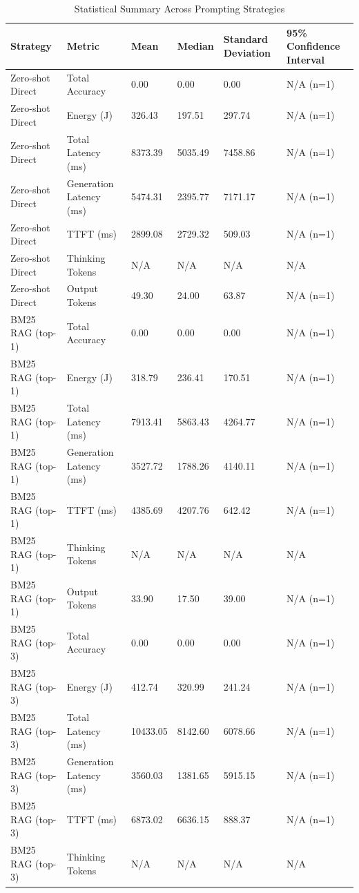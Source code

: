 \begin{table}
\caption{Statistical Summary Across Prompting Strategies}
\label{tab:statistical_summary}
\begin{tabular}{llllll}
\toprule
Strategy & Metric & Mean & Median & Standard Deviation & 95\% Confidence Interval \\
\midrule
Zero-shot Direct & Total Accuracy & 0.00 & 0.00 & 0.00 & N/A (n=1) \\
Zero-shot Direct & Energy (J) & 326.43 & 197.51 & 297.74 & N/A (n=1) \\
Zero-shot Direct & Total Latency (ms) & 8373.39 & 5035.49 & 7458.86 & N/A (n=1) \\
Zero-shot Direct & Generation Latency (ms) & 5474.31 & 2395.77 & 7171.17 & N/A (n=1) \\
Zero-shot Direct & TTFT (ms) & 2899.08 & 2729.32 & 509.03 & N/A (n=1) \\
Zero-shot Direct & Thinking Tokens & N/A & N/A & N/A & N/A \\
Zero-shot Direct & Output Tokens & 49.30 & 24.00 & 63.87 & N/A (n=1) \\
BM25 RAG (top-1) & Total Accuracy & 0.00 & 0.00 & 0.00 & N/A (n=1) \\
BM25 RAG (top-1) & Energy (J) & 318.79 & 236.41 & 170.51 & N/A (n=1) \\
BM25 RAG (top-1) & Total Latency (ms) & 7913.41 & 5863.43 & 4264.77 & N/A (n=1) \\
BM25 RAG (top-1) & Generation Latency (ms) & 3527.72 & 1788.26 & 4140.11 & N/A (n=1) \\
BM25 RAG (top-1) & TTFT (ms) & 4385.69 & 4207.76 & 642.42 & N/A (n=1) \\
BM25 RAG (top-1) & Thinking Tokens & N/A & N/A & N/A & N/A \\
BM25 RAG (top-1) & Output Tokens & 33.90 & 17.50 & 39.00 & N/A (n=1) \\
BM25 RAG (top-3) & Total Accuracy & 0.00 & 0.00 & 0.00 & N/A (n=1) \\
BM25 RAG (top-3) & Energy (J) & 412.74 & 320.99 & 241.24 & N/A (n=1) \\
BM25 RAG (top-3) & Total Latency (ms) & 10433.05 & 8142.60 & 6078.66 & N/A (n=1) \\
BM25 RAG (top-3) & Generation Latency (ms) & 3560.03 & 1381.65 & 5915.15 & N/A (n=1) \\
BM25 RAG (top-3) & TTFT (ms) & 6873.02 & 6636.15 & 888.37 & N/A (n=1) \\
BM25 RAG (top-3) & Thinking Tokens & N/A & N/A & N/A & N/A \\

\end{tabular}
\end{table}
